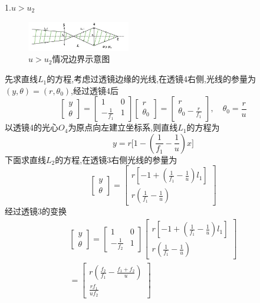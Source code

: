 \documentclass[UTF8]{gapd}
\begin{document}
1.$u>u_2$
\begin{figure}
  \centering
  \includegraphics[width=0.4\textwidth]{images/6.jpg}
  \caption{$u>u_2$情况边界示意图}
  \label{fig:6}
\end{figure}
先求直线$L_1$的方程,考虑过透镜边缘的光线,在透镜4右侧,光线的参量为$(y,\theta)=(r,\theta_0)$,经过透镜4后
\begin{equation}
  \begin{bmatrix}
      y\\
      \theta 
  \end{bmatrix}=\begin{bmatrix}
      1 & 0\\
      -\frac{1}{f_1}  & 1
  \end{bmatrix}
  \begin{bmatrix}
      r\\
      \theta_0 
  \end{bmatrix}=
  \begin{bmatrix}
      r\\
      \theta_0-\frac{r}{f_1} 
  \end{bmatrix}
  ,\quad \theta_0=\frac{r}{u} 
\end{equation}
以透镜4的光心$O_4$为原点向左建立坐标系,则直线$L_1$的方程为
\begin{equation}
  y=r\big[1-(\frac{1}{f_1}-\frac{1}{u}  )x\big]
\end{equation}
下面求直线$L_2$的方程,在透镜3右侧光线的参量为
\begin{equation}
  \begin{bmatrix}
      y\\
      \theta
  \end{bmatrix}=
  \begin{bmatrix}
      r[-1+(\frac{1}{f_1}-\frac{1}{u}  )l_1]\\
      r(\frac{1}{f_1}-\frac{1}{u}  )
  \end{bmatrix}
\end{equation}
经过透镜3的变换
\begin{multline}
  \begin{bmatrix}
    y\\
    \theta
\end{bmatrix}=
\begin{bmatrix}
    1 & 0\\
    -\frac{1}{f_2}  & 1
\end{bmatrix}
\begin{bmatrix}
r [-1+(\frac{1}{f_1}-\frac{1}{u}  )l_1]\\
    r(\frac{1}{f_1}-\frac{1}{u}  )
\end{bmatrix}   \\
=
\begin{bmatrix}
    r(\frac{f_2}{f_1}-\frac{f_1+f_2}{u}  )\\
    \frac{rf_1}{uf_2} 
\end{bmatrix}
\end{multline}
\end{document}
